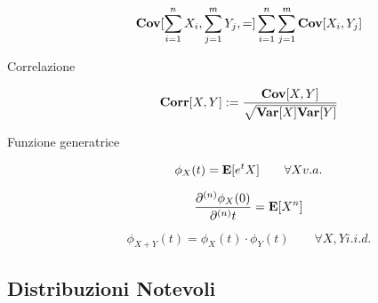 \begin{description}
		\begin{equation}
		\mathbf{Cov}[\sum_{i=1}^{n}X_{i},\sum_{j=1}^{m}Y_{j},=] \sum_{i=1}^{n}\sum_{j=1}^{m}\mathbf{Cov}[X_{i},Y_{j}]
		\end{equation}
	
	\item [Correlazione]
		\begin{equation}
		\mathbf{Corr}[X,Y] := \frac{\mathbf{Cov}[X,Y]}{\sqrt{\mathbf{Var}[X]\mathbf{Var}[Y]}}
		\end{equation}
	
	\item [Funzione generatrice]
		\begin{equation}
		\phi_{X}(t) = \mathbf{E}[e^tX] \qquad\forall X v.a.
		\end{equation}
		
		\begin{equation}
		\frac{\partial^{(n)} \phi_{X}(0)}{\partial^{(n)}t} = \mathbf{E}[X^{n}]
		\end{equation}
		
		\begin{equation}
		\phi_{X+Y}(t) = \phi_{X}(t) \cdot \phi_{Y}(t) \qquad\forall X,Y i.i.d.
		\end{equation}
	
\end{description}
\newpage

\subsection{Distribuzioni Notevoli}
